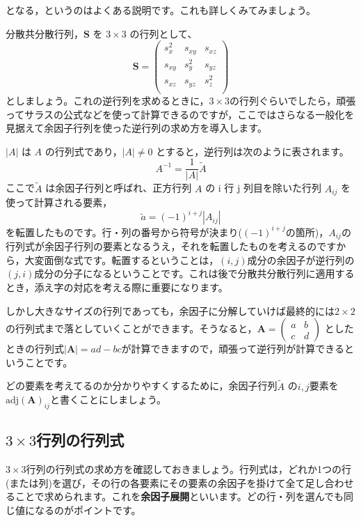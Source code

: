 \documentclass[dvipsnames]{ltjsarticle}
\begin{document}
となる，というのはよくある説明です。これも詳しくみてみましょう。

分散共分散行列，$\bm{S}$ を $3 \times 3$ の行列として、
\[
\bm{S} = \begin{pmatrix}
s_x^2 & s_{xy} & s_{xz} \\
s_{xy} & s_y^2 & s_{yz} \\
s_{xz} & s_{yz} & s_z^2 \\
\end{pmatrix} 
\]
としましょう。これの逆行列を求めるときに，$3 \times 3$の行列ぐらいでしたら，頑張ってサラスの公式などを使って計算できるのですが，ここではさらなる一般化を見据えて余因子行列を使った逆行列の求め方を導入します。

$|A|$ は $A$ の行列式であり，$|A| \neq 0$ とすると，逆行列は次のように表されます。
\[
A^{-1} = \frac{1}{|A|} \tilde{A}
\]
ここで$\tilde{A}$ は余因子行列と呼ばれ、正方行列 $A$ の i 行 j 列目を除いた行列 $A_{ij}$ を使って計算される要素，
\[
\tilde{a} = (-1)^{i+j} |A_{ij}|
\]
を転置したものです。行・列の番号から符号が決まり($(-1)^{i+j}$の箇所)，$A_{ij}$の行列式が余因子行列の要素となるうえ，それを転置したものを考えるのですから，大変面倒な式です。転置するということは，$(i,j)$成分の余因子が逆行列の$(j,i)$成分の分子になるということです。これは後で分散共分散行列に適用するとき，添え字の対応を考える際に重要になります。

しかし大きなサイズの行列であっても，余因子に分解していけば最終的には$2 \times 2$の行列式まで落としていくことができます。そうなると，$\bm{A} = \begin{pmatrix}a & b \\ c & d \end{pmatrix}$ としたときの行列式$|\bm{A}|=ad-bc$が計算できますので，頑張って逆行列が計算できるということです。

どの要素を考えてるのか分かりやすくするために，余因子行列$\tilde{A}$ の$i,j$要素を$\text{adj}(\bm{A})_{ij}$と書くことにしましょう。

\subsection{$3 \times 3$行列の行列式}

$3 \times 3$行列の行列式の求め方を確認しておきましょう。行列式は，どれか1つの行(または列)を選び，その行の各要素にその要素の余因子を掛けて全て足し合わせることで求められます。これを\textbf{余因子展開}といいます。どの行・列を選んでも同じ値になるのがポイントです。
\end{document}
